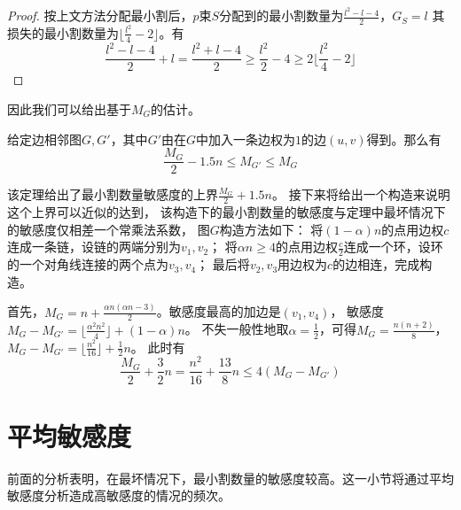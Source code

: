 \begin{proof}
  按上文方法分配最小割后，$p$束$S$分配到的最小割数量为$\frac{l^2-l-4}2$，$G_S=l$
  其损失的最小割数量为$\lfloor\frac{l^2}4-2\rfloor$。有
  \begin{equation*}
    \frac{l^2-l-4}2+l=\frac{l^2+l-4}2\geq \frac{l^2}2-4\geq 2\lfloor\frac{l^2}4-2\rfloor
  \end{equation*}
\end{proof}
因此我们可以给出基于$M_G$的估计。


\begin{theorem}
  \label{sen}
  给定边相邻图$G,G'$，其中$G'$由在$G$中加入一条边权为$1$的边$(u,v)$得到。那么有
  \begin{equation*}
    \frac{M_G}2-1.5n \leq M_{G'}\leq M_G
  \end{equation*}

\end{theorem}
该定理给出了最小割数量敏感度的上界$\frac{M_G}2+1.5n$。
接下来将给出一个构造来说明这个上界可以近似的达到，
该构造下的最小割数量的敏感度与定理中最坏情况下的敏感度仅相差一个常乘法系数，
图$G$构造方法如下：
将$(1-\alpha) n$的点用边权$c$连成一条链，设链的两端分别为$v_1,v_2$；
将$\alpha n\geq 4$的点用边权$\frac c2$连成一个环，设环的一个对角线连接的两个点为$v_3,v_4$；
最后将$v_2,v_3$用边权为$c$的边相连，完成构造。

首先，$M_G=n+\frac{\alpha n(\alpha n-3)}2$。敏感度最高的加边是$(v_1,v_4)$，
敏感度$M_G-M_{G'}=\lfloor\frac{\alpha^2 n^2}4\rfloor+(1-\alpha) n$。
不失一般性地取$\alpha=\frac 12$，可得$M_G=\frac{n(n+2)}8$，$M_G-M_{G'}=\lfloor\frac{n^2}{16}\rfloor+\frac 12n$。
此时有
\begin{equation*}
  \frac{M_G}2+\frac32n= \frac{n^2}{16}+\frac{13}{8}n\leq 4(M_G-M_{G'})
\end{equation*}


\section{平均敏感度}
前面的分析表明，在最坏情况下，最小割数量的敏感度较高。这一小节将通过平均敏感度分析造成高敏感度的情况的频次。

